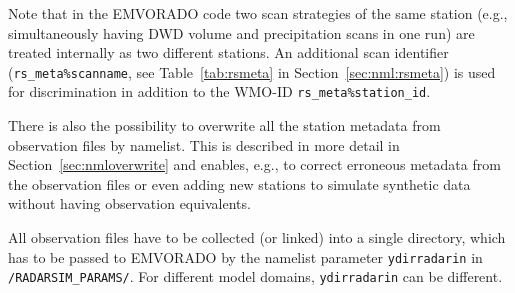\documentclass[10pt,a4paper,twoside,headinclude,footinclude,parskip=half]{scrartcl}
\newcommand{\srcform}[1]{\mbox{\texttt{#1}}\xspace}%
\newcommand{\paramform}[1]{\mbox{\texttt{#1}}\xspace}%
\begin{document}
Note that in the EMVORADO code two scan strategies of the same station (e.g., simultaneously having DWD volume and precipitation scans in one run) are treated internally as two different stations.
An additional scan identifier (\paramform{rs_meta\%scanname}, see Table~\ref{tab:rsmeta} in Section~\ref{sec:nml:rsmeta}) is used for discrimination in addition to the WMO-ID \paramform{rs_meta\%station_id}.

There is also the possibility to overwrite all the station metadata from observation files by namelist. This is described in more detail in Section~\ref{sec:nmloverwrite}
and enables, e.g., to correct erroneous metadata from the observation files or even adding new stations to simulate synthetic data without having observation equivalents.

All observation files have to be collected (or linked) into a single directory, which
has to be passed to EMVORADO by the namelist parameter \srcform{ydirradarin} in \srcform{/RADARSIM_PARAMS/}.
For different model domains, \srcform{ydirradarin} can be different.
\end{document}
